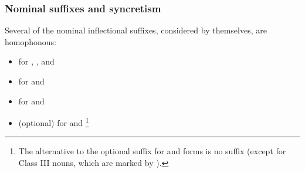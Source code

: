 \subsubsection{Nominal suffixes and syncretism}\label{nominalSuffixesSyncretism}
Several of the nominal inflectional suffixes, considered by themselves, %
are homophonous: %
\begin{itemize}
\item{ for , , and }
\item{ for  and }
\item{ for  and }
\item{(optional)  for  and \footnote{The alternative to the optional  suffix for  and  forms is no suffix (except for Class III nouns, which are marked by ).}}
\end{itemize}

